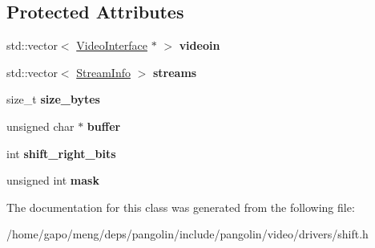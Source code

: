 \subsection*{Protected Attributes}
\begin{DoxyCompactItemize}
\item 
std\+::vector$<$ \hyperlink{structpangolin_1_1_video_interface}{Video\+Interface} $\ast$ $>$ {\bfseries videoin}\hypertarget{classpangolin_1_1_shift_video_ab4395c3eb68c486d8a8fed8195a02aec}{}\label{classpangolin_1_1_shift_video_ab4395c3eb68c486d8a8fed8195a02aec}

\item 
std\+::vector$<$ \hyperlink{classpangolin_1_1_stream_info}{Stream\+Info} $>$ {\bfseries streams}\hypertarget{classpangolin_1_1_shift_video_a1070e30e0b218fa754cd28cd61b926c3}{}\label{classpangolin_1_1_shift_video_a1070e30e0b218fa754cd28cd61b926c3}

\item 
size\+\_\+t {\bfseries size\+\_\+bytes}\hypertarget{classpangolin_1_1_shift_video_a43d1b3eefb55556e3e02b56ad0538ce9}{}\label{classpangolin_1_1_shift_video_a43d1b3eefb55556e3e02b56ad0538ce9}

\item 
unsigned char $\ast$ {\bfseries buffer}\hypertarget{classpangolin_1_1_shift_video_ab6c0151499a02c64253c601a37bb0008}{}\label{classpangolin_1_1_shift_video_ab6c0151499a02c64253c601a37bb0008}

\item 
int {\bfseries shift\+\_\+right\+\_\+bits}\hypertarget{classpangolin_1_1_shift_video_a9fc55d6a38c76797928fea95a6694f95}{}\label{classpangolin_1_1_shift_video_a9fc55d6a38c76797928fea95a6694f95}

\item 
unsigned int {\bfseries mask}\hypertarget{classpangolin_1_1_shift_video_a2ac01689d4cac5e8db54c0a220a3b8ea}{}\label{classpangolin_1_1_shift_video_a2ac01689d4cac5e8db54c0a220a3b8ea}

\end{DoxyCompactItemize}


The documentation for this class was generated from the following file\+:\begin{DoxyCompactItemize}
\item 
/home/gapo/meng/deps/pangolin/include/pangolin/video/drivers/shift.\+h\end{DoxyCompactItemize}
